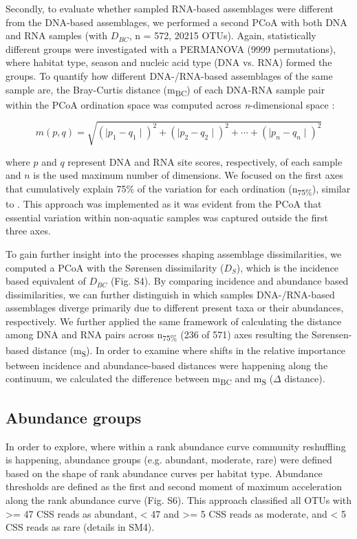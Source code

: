 \documentclass[12pt,a4paper]{article} %
\begin{document}
Secondly, to evaluate whether sampled RNA-based assemblages were different from the DNA-based assemblages, we performed a second PCoA with both DNA and RNA samples (with $D_{BC}$, n = 572, 20215 OTUs). Again, statistically different groups were investigated with a PERMANOVA (9999 permutations), where habitat type, season and nucleic acid type (DNA vs. RNA) formed the groups. To quantify how different DNA-/RNA-based assemblages of the same sample are, the Bray-Curtis distance (m\textsubscript{BC}) of each DNA-RNA sample pair within the PCoA ordination space was computed across \textit{n}-dimensional space \citep{Tabak2004}:


\[ m(p,q) = \sqrt{(\mid p_{1} - q_{1} \mid)^2 + (\mid p_{2} - q_{2} \mid)^2 + \cdots + (\mid p_{n} - q_{n} \mid)^2}\]


where $p$ and $q$ represent DNA and RNA site scores, respectively, of each sample and $n$ is the used maximum number of dimensions. We focused on the first axes that cumulatively explain 75\% of the variation for each ordination (n\textsubscript{75\%}), similar to \citet{Osterholz2016}. This approach was implemented as it was evident from the PCoA that essential variation within non-aquatic samples was captured outside the first three axes.

To gain further insight into the processes shaping assemblage dissimilarities, we computed a PCoA with the S{\o}rensen dissimilarity ($D_{S}$), which is the incidence based equivalent of $D_{BC}$ \citep{Legendre1998, Sorensen1948}(Fig. S4). By comparing incidence and abundance based dissimilarities, we can further distinguish in which samples DNA-/RNA-based assemblages diverge primarily due to different present taxa or their abundances, respectively. We further applied the same framework of calculating the distance among DNA and RNA pairs across n\textsubscript{75\%} (236 of 571) axes resulting the S{\o}rensen-based distance (m\textsubscript{S}). In order to examine where shifts in the relative importance between incidence and abundance-based distances were happening along the continuum, we calculated the difference between m\textsubscript{BC} and m\textsubscript{S} ($\Delta$ distance).

\subsection*{Abundance groups}
In order to explore, where within a rank abundance curve community reshuffling is happening, abundance groups (e.g. abundant, moderate, rare) were defined based on the shape of rank abundance curves per habitat type. Abundance thresholds are defined as the first and second moment of maximum acceleration along the rank abundance curve (Fig. S6). This approach classified all OTUs with >= 47 CSS reads as abundant, < 47 and >= 5 CSS reads as moderate, and < 5 CSS reads as rare (details in SM4).
\end{document}
